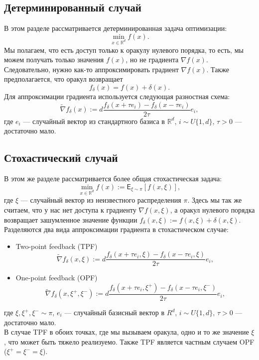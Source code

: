 \documentclass{article}
\newcommand{\R}{\mathbb{R}}
\begin{document}
\subsection{Детерминированный случай}
В этом разделе рассматривается детерминированная задача оптимизации:
\begin{equation}
 \min\limits_{x \in \R^d} f(x).
 \label{determenistic_problem}
\end{equation}
Мы полагаем, что есть доступ только к оракулу нулевого порядка, то есть, мы можем получать только значения $f(x)$, но не градиента $\nabla f(x)$. Следовательно, нужно как-то аппроксимировать градиент $\nabla f(x)$. Также предполагается, что оракул возвращает
\begin{equation}
 f_\delta (x) = f(x) + \delta (x).
\end{equation}
Для аппроксимации градиента используется следующая разностная схема:
\begin{equation}
\widetilde{\nabla} f_\delta (x) := d\frac{f_\delta (x + \tau e_i) - f_\delta (x - \tau e_i)}{2\tau} e_i,
\label{diff_scheme}
\end{equation}
где $e_i$ --- случайный вектор из стандартного базиса в $\R^d$, $i \sim U\{1, d\}$, $\tau > 0$ --- достаточно мало.

\subsection{Стохастический случай}
В этом же разделе рассматривается более общая стохастическая задача:
\begin{equation}
 \min\limits_{x \in \R^d} f(x) := \mathsf{E}_{\xi \sim \pi}[f(x, \xi)],
\end{equation}
где $\xi$ --- случайный вектор из неизвестного распределения $\pi$. Здесь мы так же считаем, что у нас нет доступа к градиенту $\nabla f(x, \xi)$, а оракул нулевого порядка возвращает зашумленное значение функции $f_\delta (x, \xi) := f(x, \xi) + \delta (x, \xi)$.\\
Разделяются два вида аппроксимации градиента в стохастическом случае:
\begin{itemize}
 \item Two-point feedback (TPF)
 \begin{equation}
  \widetilde{\nabla} f_\delta (x, \xi) := d\frac{f_\delta (x + \tau e_i, \xi) - f_\delta (x - \tau e_i, \xi)}{2\tau} e_i,
 \end{equation}
 \item One-point feedback (OPF)
 \begin{equation}
  \widetilde{\nabla} f_\delta (x, \xi^+, \xi^-) := d\frac{f_\delta (x + \tau e_i, \xi^+) - f_\delta (x - \tau e_i, \xi^-)}{2\tau} e_i,
 \end{equation}
\end{itemize}
где $\xi, \xi^+, \xi^- \sim \pi$, $e_i$ --- случайный базисный вектор в $R^d$, $i \sim U\{1, d\}$, $\tau > 0$ --- достаточно мало.\\
В случае TPF в обоих точках, где мы вызываем оракула, одно и то же значение $\xi$, что может быть тяжело реализуемо. Также TPF является частным случаем OPF ($\xi^+ = \xi^- = \xi$).
\end{document}
